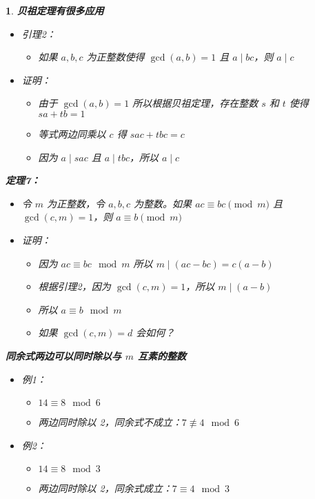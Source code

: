 \documentclass[UTF8]{report}
\theoremstyle{MyLineTheoremStyle} %
\theoremstyle{MyBlockTheoremStyle} %
\theoremstyle{MySubsubsectionStyle} %
\newtheorem{definition}{}
\begin{document}
\begin{definition}
    \textbf{贝祖定理有很多应用}
    \begin{itemize}
        \item 引理2：
        \begin{itemize}
            \item 如果 $a, b, c$ 为正整数使得 $\gcd(a, b) = 1$ 且 $a \mid bc$，则 $a \mid c$
        \end{itemize}
        \item 证明：
        \begin{itemize}
            \item 由于 $\gcd(a, b) = 1$ 所以根据贝祖定理，存在整数 $s$ 和 $t$ 使得 $sa + tb = 1$
            \item 等式两边同乘以 $c$ 得 $sac + tbc = c$
            \item 因为 $a \mid sac$ 且 $a \mid tbc$，所以 $a \mid c$
        \end{itemize}
    \end{itemize}

    \textbf{定理7：}
    \begin{itemize}
        \item 令 $m$ 为正整数，令 $a, b, c$ 为整数。如果 $ac \equiv bc \pmod m$ 且 $\gcd(c, m) = 1$，则 $a \equiv b \pmod m$
        \item 证明：
        \begin{itemize}
            \item 因为 $ac \equiv bc \mod m$ 所以 $m \mid (ac - bc) = c(a - b)$
            \item 根据引理2，因为 $\gcd(c, m) = 1$，所以 $m \mid (a - b)$
            \item 所以 $a \equiv b \mod m$
            \item 如果 $\gcd(c, m) = d$ 会如何？
        \end{itemize}
    \end{itemize}

    \textbf{同余式两边可以同时除以与 $m$ 互素的整数}
    \begin{itemize}
        \item 例1：
        \begin{itemize}
            \item $14 \equiv 8 \mod 6$
            \item 两边同时除以 2，同余式不成立：$7 \not\equiv 4 \mod 6$
        \end{itemize}
        \item 例2：
        \begin{itemize}
            \item $14 \equiv 8 \mod 3$
            \item 两边同时除以 2，同余式成立：$7 \equiv 4 \mod 3$
        \end{itemize}
    \end{itemize}


\end{definition}
\end{document}
